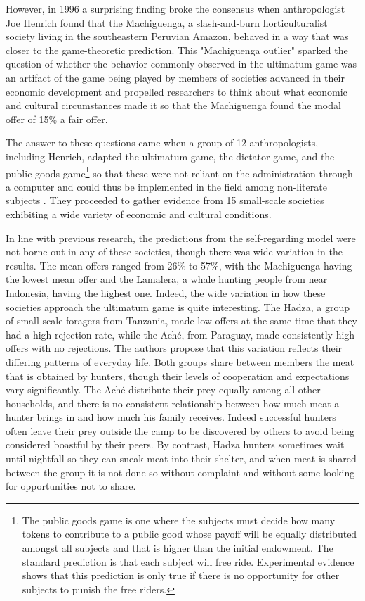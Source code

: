 \documentclass[12pt]{article}
\begin{document}
However, in 1996 a surprising finding broke the consensus when anthropologist Joe Henrich \citep{Henrich2000} found that the Machiguenga, a slash-and-burn horticulturalist society living in the southeastern Peruvian Amazon, behaved in a way that was closer to the game-theoretic prediction. This "Machiguenga outlier" sparked the question of whether the behavior commonly observed in the ultimatum game was an artifact of the game being played by members of societies advanced in their economic development and propelled researchers to think about what economic and cultural circumstances made it so that the Machiguenga found the modal offer of 15\% a fair offer.

The answer to these questions came when a group of 12 anthropologists, including Henrich, adapted the ultimatum game, the dictator game, and the public goods game\footnote{The public goods game is one where the subjects must decide how many tokens to contribute to a public good whose payoff will be equally distributed amongst all subjects and that is higher than the initial endowment. The standard prediction is that each subject will free ride. Experimental evidence shows that this prediction is only true if there is no opportunity for other subjects to punish the free riders.} so that these were not reliant on the administration through a computer and could thus be implemented in the field among non-literate subjects \citep{henrich2005economic}. They proceeded to gather evidence from 15 small-scale societies exhibiting a wide variety of economic and cultural conditions. 

In line with previous research, the predictions from the self-regarding model were not borne out in any of these societies, though there was wide variation in the results. The mean offers ranged from 26\% to 57\%, with the Machiguenga having the lowest mean offer and the Lamalera, a whale hunting people from near Indonesia, having the highest one. Indeed,  the wide variation in how these societies approach the ultimatum game is quite interesting. The Hadza, a group of small-scale foragers from Tanzania, made low offers at the same time that they had a high rejection rate, while the Aché, from Paraguay, made consistently high offers with no rejections. The authors propose that this variation reflects their differing patterns of everyday life. Both groups share between members the meat that is obtained by hunters, though their levels of cooperation and expectations vary significantly. The Aché distribute their prey equally among all other households, and there is no consistent relationship between how much meat a hunter brings in and how much his family receives. Indeed successful hunters often leave their prey outside the camp to be discovered by others to avoid being considered boastful by their peers. By contrast, Hadza hunters sometimes wait until nightfall so they can sneak meat into their shelter, and when meat is shared between the group it is not done so without complaint and without some looking for opportunities not to share. 
\end{document}
